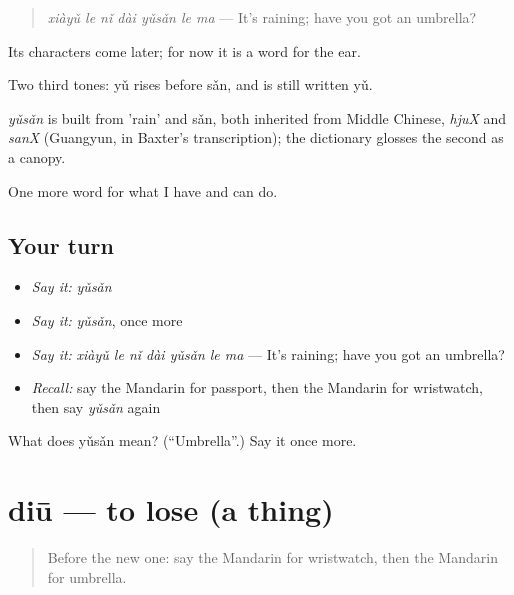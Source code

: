 \begin{quote}
\emph{xiàyǔ le nǐ dài yǔsǎn le ma} — It's raining; have you got an umbrella?
\end{quote}

Its characters come later; for now it is a word for the ear.

Two third tones: yǔ rises before sǎn, and is still written yǔ.

\begin{cousinweb}
\emph{yǔsǎn} is built from  'rain' and sǎn, both inherited from Middle Chinese, \emph{hjuX} and \emph{sanX} (Guangyun, in Baxter's transcription); the dictionary glosses the second as a canopy.
\end{cousinweb}

\begin{grammarlens}[title={What you've built}]
One more word for what I have and can do.
\end{grammarlens}

\subsection*{Your turn}
\begin{itemize}
\raggedright
  \item \emph{Say it:} \emph{yǔsǎn}
  \item \emph{Say it:} \emph{yǔsǎn}, once more
  \item \emph{Say it:} \emph{xiàyǔ le nǐ dài yǔsǎn le ma} — It's raining; have you got an umbrella?
  \item \emph{Recall:} say the Mandarin for passport, then the Mandarin for wristwatch, then say \emph{yǔsǎn} again
\end{itemize}

\begin{tcolorbox}[breakable,colback=teal!4,colframe=teal!35!black,title={Before you move on}]
What does yǔsǎn mean? (\textquotedblleft{}Umbrella\textquotedblright{}.) Say it once more.
\end{tcolorbox}
\section[diū]{diū — to lose (a thing)}

\label{lesson:ZH-C116-diu}



\begin{quote}
Before the new one: say the Mandarin for wristwatch, then the Mandarin for umbrella.
\end{quote}

